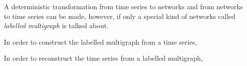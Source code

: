 \documentclass[12pt]{article}
\begin{document}
A deterministic transformation from time series to networks and from networks to time series can be made, however, if only a special kind of networks called \emph{labelled multigraph} is talked about. %

In order to construct the labelled multigraph from a time series,


In order to reconstruct the time series from a labelled multigraph,



%

%
%

\end{document}
